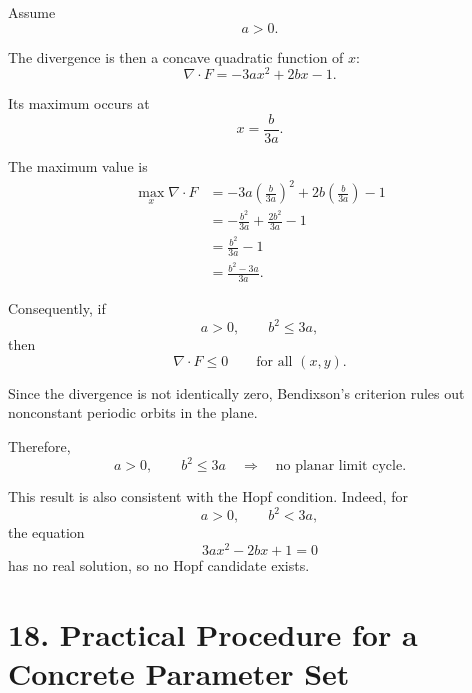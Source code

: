 \documentclass[11pt,a4paper]{article}
\begin{document}
Assume
\begin{equation}
a>0.
\end{equation}

The divergence is then a concave quadratic function of $x$:
\begin{equation}
\nabla\cdot F
=
-3ax^2+2bx-1.
\end{equation}

Its maximum occurs at
\begin{equation}
x=\frac{b}{3a}.
\end{equation}

The maximum value is
\begin{align}
\max_x\nabla\cdot F
&=
-3a\left(\frac{b}{3a}\right)^2
+
2b\left(\frac{b}{3a}\right)-1\\
&=
-\frac{b^2}{3a}
+
\frac{2b^2}{3a}
-1\\
&=
\frac{b^2}{3a}-1\\
&=
\frac{b^2-3a}{3a}.
\end{align}

Consequently, if
\begin{equation}
\boxed{
a>0,
\qquad
b^2\le3a,
}
\tag{62}
\end{equation}
then
\begin{equation}
\boxed{
\nabla\cdot F\le0
\qquad\text{for all }(x,y).
}
\tag{63}
\end{equation}

Since the divergence is not identically zero, Bendixson's criterion
rules out nonconstant periodic orbits in the plane.

Therefore,
\begin{equation}
\boxed{
a>0,\qquad b^2\le3a
\quad\Longrightarrow\quad
\text{no planar limit cycle}.
}
\tag{64}
\end{equation}

This result is also consistent with the Hopf condition. Indeed, for
\begin{equation}
a>0,\qquad b^2<3a,
\end{equation}
the equation
\begin{equation}
3ax^2-2bx+1=0
\end{equation}
has no real solution, so no Hopf candidate exists.

\section{18. Practical Procedure for a Concrete Parameter Set}
\end{document}
